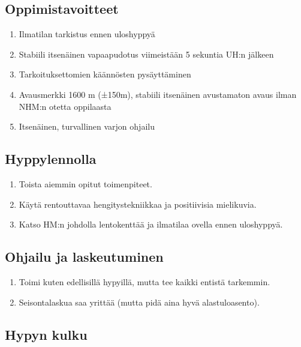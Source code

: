 \begin{multicols}{2}
\subsection{ Oppimistavoitteet }
\label{nova-alkeiskoulutuksen-suoritukset-oppimistavoitteet}

\begin{enumerate}[label=\bfseries \arabic*)]
\item  Ilmatilan tarkistus ennen uloshyppyä 
\item  Stabiili itsenäinen vapaapudotus viimeistään 5 sekuntia UH:n jälkeen 
\item  Tarkoituksettomien käännösten pysäyttäminen 
\item  Avausmerkki 1600 m (±150m), stabiili itsenäinen avustamaton avaus ilman NHM:n otetta oppilaasta 
\item  Itsenäinen, turvallinen varjon ohjailu 
\end{enumerate}
\subsection{ Hyppylennolla }
\label{nova-alkeiskoulutuksen-suoritukset-hyppylennolla}

\begin{enumerate}[label=\bfseries \arabic*)]
\item  Toista aiemmin opitut toimenpiteet. 
\item  Käytä rentouttavaa hengitystekniikkaa ja positiivisia mielikuvia. 
\item  Katso HM:n johdolla lentokenttää ja ilmatilaa ovella ennen uloshyppyä. 
\end{enumerate}
\subsection{ Ohjailu ja laskeutuminen }
\label{nova-alkeiskoulutuksen-suoritukset-ohjailu-ja-laskeutuminen}

\begin{enumerate}[label=\bfseries \arabic*)]
\item  Toimi kuten edellisillä hypyillä, mutta tee kaikki entistä tarkemmin. 
\item  Seisontalaskua saa yrittää (mutta pidä aina hyvä alastuloasento). 
\end{enumerate}
\subsection{ Hypyn kulku }
\label{nova-alkeiskoulutuksen-suoritukset-hypyn-kulku}


\end{multicols}
